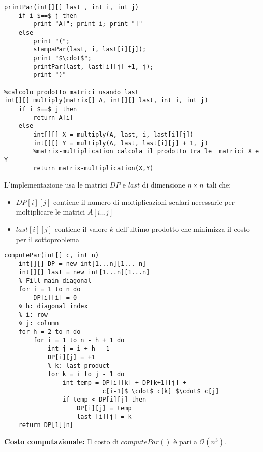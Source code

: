 \documentclass[../cheatSheetAlgoritmi.tex]{subfiles}
\begin{document}
\newpage
\begin{lstlisting}[caption= Calcolo prodotto di matrici e stampa parentesizzazione ottima usando matrice last]
%ricostruzione della soluzione (stampa prodotto)
printPar(int[][] last , int i, int j)
	if i $==$ j then
		print "A["; print i; print "]"
	else
		print "(";
		stampaPar(last, i, last[i][j]);
		print "$\cdot$";
		printPar(last, last[i][j] +1, j);
		print ")"

%calcolo prodotto matrici usando last 
int[][] multiply(matrix[] A, int[][] last, int i, int j)
	if i $==$ j then
		return A[i]
	else
		int[][] X = multiply(A, last, i, last[i][j])
		int[][] Y = multiply(A, last, last[i][j] + 1, j)
		%matrix-multiplication calcola il prodotto tra le  matrici X e Y
		return matrix-multiplication(X,Y)
\end{lstlisting}
\noindent
L'implementazione usa le matrici $DP$ e $last$ di dimensione $n \times n$ tali che:
\begin{itemize}
	\item $DP[i][j]$ contiene il numero di moltiplicazioni scalari necessarie per moltiplicare le matrici $A[i...j]$ 
	\item $last [i][j]$ contiene il valore $k$ dell'ultimo prodotto che minimizza il costo per il sottoproblema
\end{itemize}
\begin{lstlisting}[caption= Calcolo parentesizzazione ottima]
%calcolo della soluzione ottima
computePar(int[] c, int n)
	int[][] DP = new int[1...n][1... n]
	int[][] last = new int[1...n][1...n]
	% Fill main diagonal
	for i = 1 to n do 
		DP[i][i] = 0
	% h: diagonal index
	% i: row
	% j: column
	for h = 2 to n do
		for i = 1 to n - h + 1 do 
			int j = i + h - 1 
			DP[i][j] = +1
			% k: last product
			for k = i to j - 1 do 
				int temp = DP[i][k] + DP[k+1][j] + 
				           c[i-1]$ \cdot$ c[k] $\cdot$ c[j]
				if temp < DP[i][j] then
					DP[i][j] = temp
					last [i][j] = k
	return DP[1][n]
\end{lstlisting}
\textbf{Costo computazionale:} Il costo di $computePar()$ è pari a $\mathcal{O}(n^{3})$.
\newpage
\end{document}
